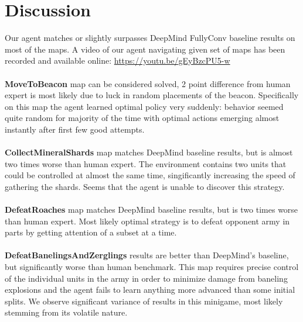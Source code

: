 \section{Discussion}

Our agent matches or slightly surpasses DeepMind FullyConv baseline results on most of the maps. A video of our agent navigating given set of maps has been recorded and available online: \url{https://youtu.be/gEyBzcPU5-w}
\\\\
\textbf{MoveToBeacon} map can be considered solved, 2 point difference from human expert is most likely due to luck in random placements of the beacon. Specifically on this map the agent learned optimal policy very suddenly: behavior seemed quite random for majority of the time with optimal actions emerging almost instantly after first few good attempts.
\\\\
\textbf{CollectMineralShards} map matches DeepMind baseline results, but is almost two times worse than human expert.
The environment contains two units that could be controlled at almost the same time, singificantly increasing the speed of gathering the shards. Seems that the agent is unable to discover this strategy.
\\\\
\textbf{DefeatRoaches} map matches DeepMind baseline results, but is two times worse than human expert.
Most likely optimal strategy is to defeat opponent army in parts by getting attention of a subset at a time.
\\\\
\textbf{DefeatBanelingsAndZerglings} results are better than DeepMind's baseline, but significantly worse than human benchmark.
This map requires precise control of the individual units in the army in order to minimize damage from baneling explosions and the agent fails to learn anything more advanced than some initial splits. We observe significant variance of results in this minigame, most likely stemming from its volatile nature.
\\\\
